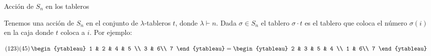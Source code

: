 \documentclass[final,xcolor=svgnames]{beamer}
\DeclareMathOperator{\sgn}{sgn}
\begin{document}
\begin{frame}{}
\begin{columns}
\begin{column}{0.5\textwidth}
      \begin{block}{Acción de $S_{n}$ en los tableros}
        \begin{minipage}{0.54\linewidth}
          Tenemos una acción de $S_{n}$ en el conjunto de
          $\lambda$-tableros $t$, donde $\lambda\vdash n$.  Dada
          $\sigma\in S_{n}$ el tablero $\sigma\cdot t$ es el tablero
          que coloca el número $\sigma(i)$ en la caja donde $t$ coloca
          a $i$. Por ejemplo:
        \end{minipage}
        \begin{minipage}{0.42\linewidth}
          \centering
          \begin{equation*}(123)(45)\,
            \begin{ytableau}
              1 & 2 & 4 & 5 \\
              3 & 6\\
              7
            \end{ytableau}
            =
            \begin{ytableau}
              2 & 3 & 5 & 4 \\
              1 & 6\\
              7
            \end{ytableau}
          \end{equation*}
        \end{minipage}
      \end{block}




\end{column}
\end{columns}
\end{frame}
\end{document}
